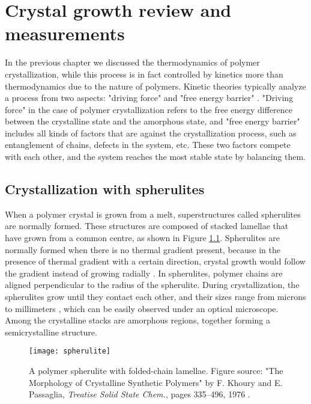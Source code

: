 \chapter{Crystal growth review and measurements}\label{chap_growth}
\graphicspath{{./growth/graphs/}}

In the previous chapter we discussed the thermodynamics of polymer crystallization, while this process is in fact controlled by kinetics more than thermodynamics due to the nature of polymers. Kinetic theories typically analyze a process from two aspects: "driving force" and "free energy barrier" \cite{Zhang2016a}. "Driving force" in the case of polymer crystallization refers to the free energy difference between the crystalline state and the amorphous state, and "free energy barrier" includes all kinds of factors that are against the crystallization process, such as entanglement of chains, defects in the system, etc. These two factors compete with each other, and the system reaches the most stable state by balancing them.

\section{Crystallization with spherulites}

When a polymer crystal is grown from a melt, superstructures called spherulites are normally formed. These structures are composed of stacked lamellae that have grown from a common centre, as shown in Figure \ref{fig:spherulite}. Spherulites are normally formed when there is no thermal gradient present, because in the presence of thermal gradient with a certain direction, crystal growth would follow the gradient instead of growing radially \cite{Carraher2003}. In spherulites, polymer chains are aligned perpendicular to the radius of the spherulite. During crystallization, the spherulites grow until they contact each other, and their sizes range from microns to millimeters \cite{Vasile2000}, which can be easily observed under an optical microscope. Among the crystalline stacks are amorphous regions, together forming a semicrystalline structure.

\begin{figure}[H]
\center
\texttt{[image: spherulite]}
\caption[A polymer spherulite with folded-chain lamellae.]{A polymer spherulite with folded-chain lamellae. Figure source: "The Morphology of Crystalline Synthetic Polymers" by F. Khoury and E. Passaglia, \textit{Treatise Solid State Chem.}, pages 335–496, 1976 \cite{Khoury1976}.}
\label{fig:spherulite}
\end{figure}

